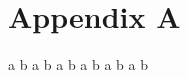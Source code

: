 \chapter{Appendix A}\label{chap:introduction}

a
\newpage
b
\newpage
a
\newpage
b
\newpage
a
\newpage
b
\newpage
a
\newpage
b
\newpage
a
\newpage
b
\newpage
a
\newpage
b
\newpage
